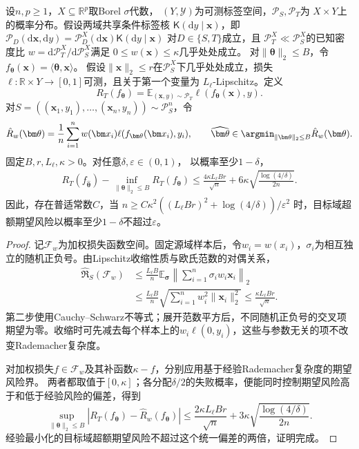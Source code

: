 \begin{theorem}[范数受限线性预测的迁移保证]
\label{thm:transfer-linear-norm}
设$n,p\geq1$，$X\subseteq\mathbb R^p$取Borel $\sigma$代数，
$(Y,\mathcal Y)$为可测标签空间，$\mathcal P_S,\mathcal P_T$为
$X\times Y$上的概率分布。假设两域共享条件标签核
$\mathsf K(\mathrm dy\mid\bm x)$，即
$\mathcal P_D(\mathrm d\bm x,\mathrm dy)
=\mathcal P_D^X(\mathrm d\bm x)\mathsf K(\mathrm dy\mid\bm x)$
对$D\in\{S,T\}$成立，且
$\mathcal P_T^X\ll\mathcal P_S^X$的已知密度比
$w=\mathrm d\mathcal P_T^X/\mathrm d\mathcal P_S^X$满足
$0\leq w(\bm x)\leq\kappa$几乎处处成立。
对$\|\bm\theta\|_2\leq B$，令
$f_{\bm\theta}(\bm x)=\langle\bm\theta,\bm x\rangle$。
假设$\|\bm x\|_2\leq r$在$\mathcal P_S^X$下几乎处处成立，损失
$\ell:\mathbb R\times Y\to[0,1]$可测，且关于第一个变量为
$L_{\ell}$-Lipschitz。定义
\[
 R_T(f_{\bm\theta})=\mathbb E_{(\bm x,y)\sim\mathcal P_T}
 \ell(f_{\bm\theta}(\bm x),y).
\]
对$S=((\bm x_1,y_1),\ldots,(\bm x_n,y_n))\sim\mathcal P_S^n$，令
\[
 \hat R_w(\bm\theta)=\frac1n\sum_{i=1}^n
 w(\bm x_i)\ell(f_{\bm\theta}(\bm x_i),y_i),\qquad
 \widehat{\bm\theta}\in\argmin_{\|\bm\theta\|_2\leq B}\hat R_w(\bm\theta).
\]
固定$B,r,L_{\ell},\kappa>0$。对任意$\delta,\varepsilon\in(0,1)$，
以概率至少$1-\delta$，
\begin{equation}
 \begin{aligned}
 R_T(f_{\widehat{\bm\theta}})
 -\inf_{\|\bm\theta\|_2\leq B}R_T(f_{\bm\theta})
 \leq\frac{4\kappa L_{\ell}Br}{\sqrt n}
       +6\kappa\sqrt{\frac{\log(4/\delta)}{2n}}.
 \end{aligned}
 \label{eq:transfer-norm-excess}
\end{equation}
因此，存在普适常数$C$，当
$n\geq C\kappa^2((L_{\ell}Br)^2+\log(4/\delta))/\varepsilon^2$
时，目标域超额期望风险以概率至少$1-\delta$不超过$\varepsilon$。
\end{theorem}
\begin{proof}
记$\mathcal F_w$为加权损失函数空间。固定源域样本后，令$w_i=w(x_i)$，$\sigma_i$为相互独立的随机正负号。由Lipschitz收缩性质与欧氏范数的对偶关系，
\begin{align*}
 \widehat{\mathfrak R}_S(\mathcal F_w)
 &\leq\frac{L_{\ell}B}{n}\mathbb E_{\bm\sigma}
       \left\|\sum_{i=1}^n\sigma_iw_i\bm x_i\right\|_2\\
 &\leq\frac{L_{\ell}B}{n}\sqrt{\sum_{i=1}^n w_i^2\|\bm x_i\|_2^2}
 \leq\frac{\kappa L_{\ell}Br}{\sqrt n}.
\end{align*}
第二步使用Cauchy--Schwarz不等式；展开范数平方后，不同随机正负号的交叉项期望为零。收缩时可先减去每个样本上的$w_i\ell(0,y_i)$，这些与参数无关的项不改变Rademacher复杂度。

对加权损失$f\in\mathcal F_w$及其补函数$\kappa-f$，分别应用基于经验Rademacher复杂度的期望风险界。
两者都取值于$[0,\kappa]$；各分配$\delta/2$的失败概率，便能同时控制期望风险高于和低于经验风险的偏差，得到
\[
 \sup_{\|\bm\theta\|_2\leq B}
 |R_T(f_{\bm\theta})-\hat R_w(f_{\bm\theta})|
 \leq\frac{2\kappa L_{\ell}Br}{\sqrt n}
       +3\kappa\sqrt{\frac{\log(4/\delta)}{2n}}.
\]
经验最小化的目标域超额期望风险不超过这个统一偏差的两倍，证明完成。
\end{proof}

